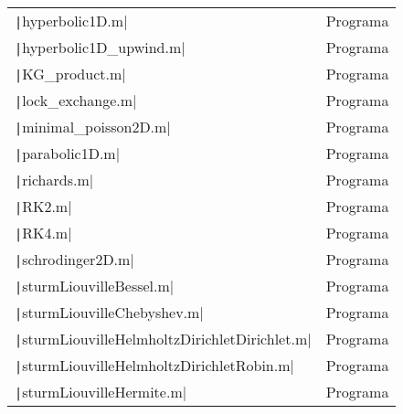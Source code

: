 \begin{table}[ht!]
\begin{tabular}{|l|l|}
		\texttt|hyperbolic1D.m|                                                                                          & Programa    \\
		\texttt|hyperbolic1D_upwind.m|                                                                                   & Programa    \\
		\texttt|KG_product.m|                                                                                            & Programa    \\
		\texttt|lock_exchange.m|                                                                                         & Programa    \\
		\texttt|minimal_poisson2D.m|                                                                                     & Programa    \\
		\texttt|parabolic1D.m|                                                                                           & Programa    \\
		\texttt|richards.m|                                                                                              & Programa    \\
		\texttt|RK2.m|                                                                                                   & Programa    \\
		\texttt|RK4.m|                                                                                                   & Programa    \\
		\texttt|schrodinger2D.m|                                                                                         & Programa    \\
		\texttt|sturmLiouvilleBessel.m|                                                                                  & Programa    \\
		\texttt|sturmLiouvilleChebyshev.m|                                                                               & Programa    \\
		\texttt|sturmLiouvilleHelmholtzDirichletDirichlet.m|                                                             & Programa    \\
		\texttt|sturmLiouvilleHelmholtzDirichletRobin.m|                                                                 & Programa    \\
		\texttt|sturmLiouvilleHermite.m|                                                                                 & Programa    \\

\end{tabular}
\end{table}
